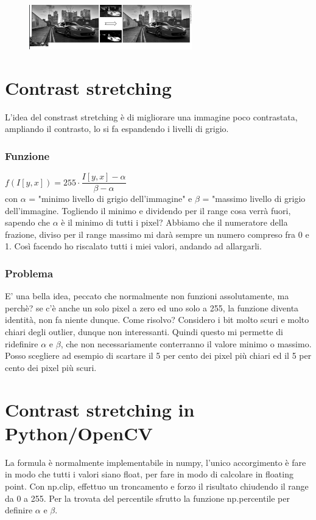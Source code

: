 \begin{figure}[htp]
	\includegraphics[width=200pt]{./immagini/ferrari_binarizzata.png}
	\label{img:ferrari_binarizzata}
\end{figure}

\section{Contrast stretching}

L'idea del constrast stretching è di migliorare una immagine poco contrastata, ampliando il contrasto, lo si fa espandendo i livelli di grigio. 
\subsubsection{Funzione}
$f(I[y, x]) = 255 \cdot \dfrac{I[y, x] - \alpha}{\beta - \alpha}$\\
 con $\alpha$ = "minimo livello di grigio dell'immagine" e $\beta$ = "massimo livello di grigio dell'immagine. Togliendo il minimo e dividendo per il range cosa verrà fuori, sapendo che $\alpha$ è il minimo di tutti i pixel? Abbiamo che il numeratore della frazione, diviso per il range massimo mi darà sempre un numero compreso fra 0 e 1. Così facendo ho riscalato tutti i miei valori, andando ad allargarli.
 \subsubsection{Problema}
 E' una bella idea, peccato che normalmente non funzioni assolutamente, ma perchè? se c'è anche un solo pixel a zero ed uno solo a 255, la funzione diventa identità, non fa niente dunque. Come risolvo? Considero i bit molto scuri e molto chiari degli outlier, dunque non interessanti. Quindi questo mi permette di ridefinire $\alpha$ e $\beta$, che non necessariamente conterranno il valore minimo o massimo. Posso scegliere ad esempio di scartare il 5 per cento dei pixel più chiari ed il 5 per cento dei pixel più scuri. 

\section{Contrast stretching in Python/OpenCV}

La formula è normalmente implementabile in numpy, l'unico accorgimento è fare in modo che tutti i valori siano float, per fare in modo di calcolare in floating point. Con np.clip, effettuo un troncamento e forzo il risultato chiudendo il range da 0 a 255. Per la trovata del percentile sfrutto la funzione np.percentile per  definire $\alpha$ e $\beta$.

